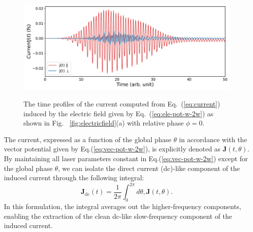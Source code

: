 \begin{figure}[htbp]
\centering
 \includegraphics[width=1.0\linewidth]{pic/initial_current.pdf}
\caption{\label{fig:initial_current}} 
The time profiles of the current computed from Eq.~(\ref{eq:current}) induced by the electric field given by Eq.~(\ref{eq:ele-pot-w-2w}) as shown in Fig. ~\ref{fig:electricfield}(a) with relative phase $\phi=0$. 
\end{figure}
The current, expressed as a function of the global phase $\theta$ in accordance with the vector potential given by Eq.(\ref{eq:vec-pot-w-2w}), is explicitly denoted as $\mathbf{J}(t,\theta)$. By maintaining all laser parameters constant in Eq.(\ref{eq:vec-pot-w-2w}) except for the global phase $\theta$, we can isolate the direct current (dc)-like component of the induced current through the following integral:
\begin{equation}
\mathbf{J}_{\text{dc}}(t) = \frac{1}{2\pi} \int_0^{2\pi} d\theta , \mathbf{J}(t,\theta).
\label{eq:dc-current}
\end{equation}
In this formulation, the integral averages out the higher-frequency components, enabling the extraction of the clean dc-like slow-frequency component of the induced current.
